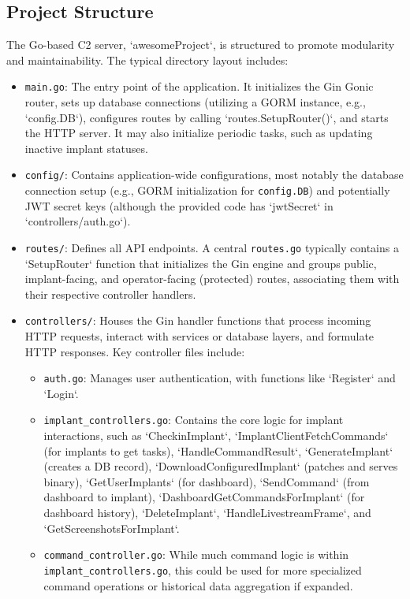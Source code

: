 \subsection{Project Structure}
The Go-based C2 server, `awesomeProject`, is structured to promote modularity and maintainability. The typical directory layout includes:
\begin{itemize}
    \item \texttt{main.go}: The entry point of the application. It initializes the Gin Gonic router, sets up database connections (utilizing a GORM instance, e.g., `config.DB`), configures routes by calling `routes.SetupRouter()`, and starts the HTTP server. It may also initialize periodic tasks, such as updating inactive implant statuses.
    \item \texttt{config/}: Contains application-wide configurations, most notably the database connection setup (e.g., GORM initialization for \texttt{config.DB}) and potentially JWT secret keys (although the provided code has `jwtSecret` in `controllers/auth.go`).
    \item \texttt{routes/}: Defines all API endpoints. A central \texttt{routes.go} typically contains a `SetupRouter` function that initializes the Gin engine and groups public, implant-facing, and operator-facing (protected) routes, associating them with their respective controller handlers.
    \item \texttt{controllers/}: Houses the Gin handler functions that process incoming HTTP requests, interact with services or database layers, and formulate HTTP responses. Key controller files include:
        \begin{itemize}
            \item \texttt{auth.go}: Manages user authentication, with functions like `Register` and `Login`.
            \item \texttt{implant\_controllers.go}: Contains the core logic for implant interactions, such as `CheckinImplant`, `ImplantClientFetchCommands` (for implants to get tasks), `HandleCommandResult`, `GenerateImplant` (creates a DB record), `DownloadConfiguredImplant` (patches and serves binary), `GetUserImplants` (for dashboard), `SendCommand` (from dashboard to implant), `DashboardGetCommandsForImplant` (for dashboard history), `DeleteImplant`, `HandleLivestreamFrame`, and `GetScreenshotsForImplant`.
            \item \texttt{command\_controller.go}: While much command logic is within \texttt{implant\_controllers.go}, this could be used for more specialized command operations or historical data aggregation if expanded.

\end{itemize}
\end{itemize}
